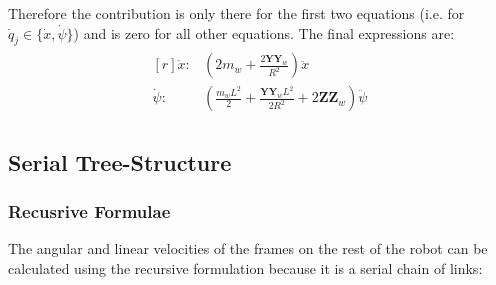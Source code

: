 \documentclass[a4paper,10pt]{article}
\begin{document}
Therefore the contribution is only there for the first two equations (i.e. for $\dot{q}_j \in \{ \dot{x}, \dot\psi \}$) and is zero for all other equations.
The final expressions are:
\begin{align}
 \begin{matrix*}[r]
  \dot{x}: & \left(2m_w+\frac{2\mathbf{YY}_w}{R^2}\right)\ddot{x}  \\ 
  \dot\psi: & \left(\frac{m_wL^2}{2} + \frac{\mathbf{YY}_wL^2}{2R^2} + 2\mathbf{ZZ}_w\right) \ddot\psi 
 \end{matrix*} \label{kanesWheels2}
\end{align}

\subsection{Serial Tree-Structure}

\subsubsection{Recusrive Formulae}

The angular and linear velocities of the frames on the rest of the robot can be calculated using the recursive formulation because it is a serial chain of links:
\end{document}
